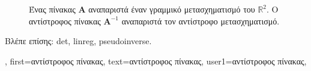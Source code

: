 {{\begin{figure}[H]
			{
 			\caption{\foreignlanguage{greek}{Ένας πίνακας $\mathbf{A}$ αναπαριστά έναν γραμμικό μετασχηματισμό 
			του $\mathbb{R}^{2}$. Ο αντίστροφος πίνακας $\mathbf{A}^{-1}$ αναπαριστά τον αντίστροφο 
			μετασχηματισμό.} \label{fig_matrix_inverse_dict}} }
 		\end{figure}
		\foreignlanguage{greek}{Βλέπε επίσης:} \gls{det}, \gls{linreg}, \gls{pseudoinverse}.},
	first={\foreignlanguage{greek}{αντίστροφος πίνακας}},
	text={\foreignlanguage{greek}{αντίστροφος πίνακας}},
	user1={\foreignlanguage{greek}{αντίστροφος πίνακας}}, %
}

